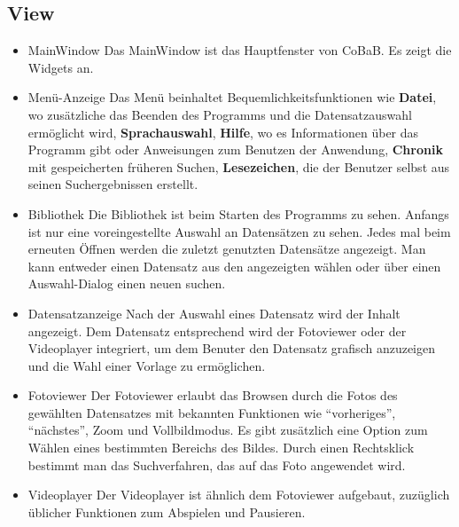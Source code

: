 \subsection{View}
\begin{itemize}
\item MainWindow \newline
Das MainWindow ist das Hauptfenster von CoBaB. Es zeigt die \glspl{Widget} an.

\item Menü-Anzeige \newline
Das Menü beinhaltet Bequemlichkeitsfunktionen wie \textbf{Datei}, wo zusätzliche das Beenden des Programms und die Datensatzauswahl ermöglicht wird, \textbf{Sprachauswahl}, \textbf{Hilfe}, wo es Informationen über das Programm gibt oder Anweisungen zum Benutzen der Anwendung, \textbf{Chronik} mit gespeicherten früheren Suchen, \textbf{Lesezeichen}, die der Benutzer selbst aus seinen Suchergebnissen erstellt.

\item Bibliothek \newline
Die Bibliothek ist beim Starten des Programms zu sehen. Anfangs ist nur eine voreingestellte Auswahl an Datensätzen zu sehen. Jedes mal beim erneuten Öffnen werden die zuletzt genutzten Datensätze angezeigt. Man kann entweder einen Datensatz aus den angezeigten wählen oder über einen Auswahl-Dialog einen neuen suchen.

\item Datensatzanzeige \newline
Nach der Auswahl eines Datensatz wird der Inhalt angezeigt. Dem Datensatz entsprechend wird der Fotoviewer oder der Videoplayer integriert, um dem Benuter den Datensatz grafisch anzuzeigen und die Wahl einer Vorlage zu ermöglichen.

\item Fotoviewer \newline
Der Fotoviewer erlaubt das Browsen durch die Fotos des gewählten Datensatzes mit bekannten Funktionen wie \enquote{vorheriges}, \enquote{nächstes}, Zoom und Vollbildmodus. Es gibt zusätzlich eine Option zum Wählen eines bestimmten Bereichs des Bildes. Durch einen Rechtsklick bestimmt man das Suchverfahren, das auf das Foto angewendet wird.

\item Videoplayer \newline
Der Videoplayer ist ähnlich dem Fotoviewer aufgebaut, zuzüglich üblicher Funktionen zum Abspielen und Pausieren.


\end{itemize}
